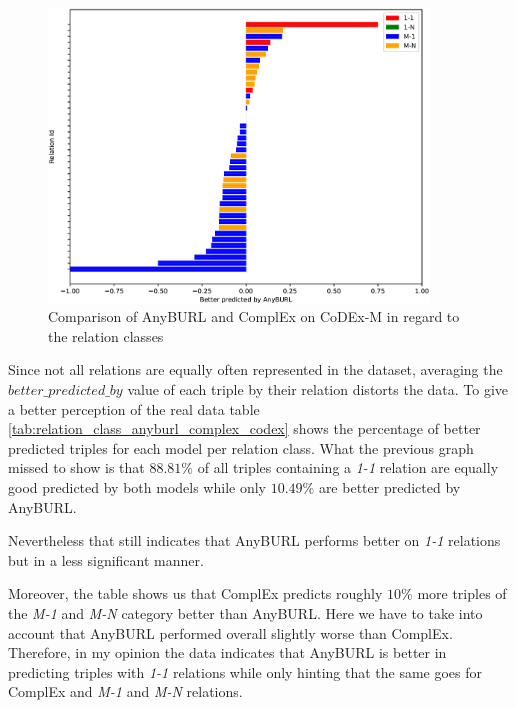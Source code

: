 \begin{figure}[H]
\centering
\includegraphics[width=0.9\textwidth]{images/relation_class_anyburl_complex_codex.PNG}
\caption{Comparison of AnyBURL and ComplEx on CoDEx-M in regard to the relation classes}
\label{fig:relation_class_anyburl_complex_codex}
\end{figure}

Since not all relations are equally often represented in the dataset, averaging the $better\_predicted\_by$ value of each triple by their relation distorts the data. To give a better perception of the real data table \ref{tab:relation_class_anyburl_complex_codex} shows the percentage of better predicted triples for each model per relation class. What the previous graph missed to show is that $88.81\%$ of all triples containing a \textit{1-1} relation are equally good predicted by both models while only $10.49\%$ are better predicted by AnyBURL. 

Nevertheless that still indicates that AnyBURL performs better on \textit{1-1} relations but in a less significant manner. 

Moreover, the table shows us that ComplEx predicts roughly $10\%$ more triples of the \textit{M-1} and \textit{M-N} category better than AnyBURL. Here we have to take into account that AnyBURL performed overall slightly worse than ComplEx. Therefore, in my opinion the data indicates that AnyBURL is better in predicting triples with \textit{1-1} relations while only hinting that the same goes for ComplEx and \textit{M-1} and \textit{M-N} relations.

